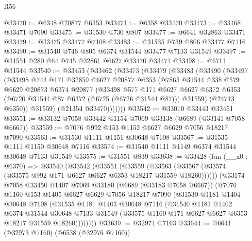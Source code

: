 \begin{lexlean}{R56}
\begin{coremodule}
@33470 := @6348 @20877 @6353
@33471 := @6358 @33470
@33473 := @33468 @33471 @7090
@33475 := @31530 @730 @807
@33477 := @6641 @32863 @33471
@33479 := @33475 @33477 @7108
@33483 := @31535 @739 @806 @33477 @7116
@33490 := @31540 @746 @805 @6374 @31544 @33477 @7133 @31549
@33497 := @31551 @280 @64 @745 @32861 @6627 @33470 @33471
@33498 := @6711 @31544
@33540 := @33453
    (@33462
      (@33473
        (@33479
          (@33483
            (@33490
              (@33497
                (@33498
                  @743
                  @171
                  @32859
                  @6627
                  @20877
                  @6353
                  (@7865
                    @31544
                    @338
                    @579
                    @6629
                    @20873
                    @6374
                    @20877
                    (@33498
                      @577
                      @171
                      @6627
                      @6627
                      @6372
                      @6353
                      (@6720 @31544 @87 @6372 (@6725 (@6726 @31544 @87)))
                      @31559)
                    (@24713 @6350))
                  @31559)
                (@21354 @33470)))))))
@33542 := @33010 @33443 @33451
@33551 := @33132 @7058 @33442 @1154 @7069 @33138 (@6689 (@33141 @7058 @6667))
@33559 := @7076 @992 @153 @1152 @6627 @6629 @7056 @18217 @7090
@33563 := @31530 @1111 @1151 @30648 @7108
@33567 := @31535 @1111 @1150 @30648 @7116
@33574 := @31540 @1111 @1149 @6374 @31544 @30648 @7133 @31549
@33575 := @31551 @839
@33638 := @33428
    (fun (__x0 : @6370) =>
    @33540
      (@33542
        (@33551
          (@33559
            (@33563 (@33567 (@33574 (@33575 @992 @171 @6627 @6627 @6353 @18217 @31559 @18260))))))
        (@33174
          @7058
          @33450
          @1407
          @7069
          @33180
          (@6689 (@33183 @7058 @6667))
          (@7076
            @1160
            @153
            @1405
            @6627
            @6629
            @7056
            @18217
            @7090
            (@31530
              @1181
              @1404
              @30648
              @7108
              (@31535
                @1181
                @1403
                @30648
                @7116
                (@31540
                  @1181
                  @1402
                  @6374
                  @31544
                  @30648
                  @7133
                  @31549
                  (@33575 @1160 @171 @6627 @6627 @6353 @18217 @31559 @18260))))))))
@33639 := @32971 @7163
@33644 := @6641 (@32973 @7160) (@6538 (@32976 @7160))

\end{coremodule}
\end{lexlean}
